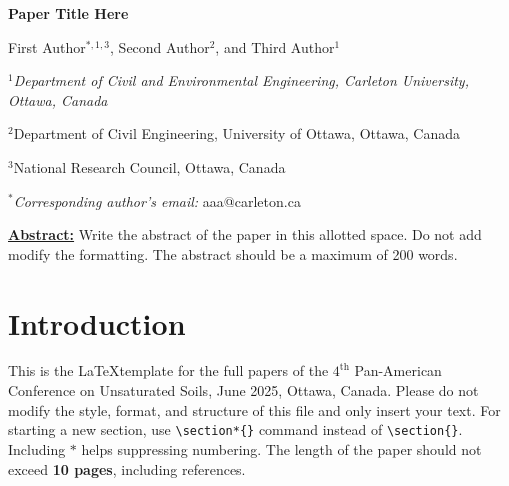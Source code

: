 \documentclass[letter,12pt]{article}
\begin{document}
\thispagestyle{fancy} %


\begin{center}
\vspace*{1.5cm}
{\large \bf Paper Title Here}
\bigskip

{First Author$^{*,1,3}$,
Second Author$^2$, 
and Third Author$^{1}$}

\smallskip

{\small\it
$^1$Department of Civil and Environmental Engineering, Carleton University, Ottawa, Canada

$^2$Department of Civil Engineering, University of Ottawa, Ottawa, Canada

$^3$National Research Council, Ottawa, Canada

}

$^*$\textit{Corresponding author's email: }aaa@carleton.ca

\end{center}


\bigskip

\noindent\underline{\textbf{Abstract:}} 
Write the abstract of the paper in this allotted space. Do not add modify the formatting. The abstract should be a maximum of 200 words. 



\bigskip
\section*{Introduction}

This is the \LaTeX template for the full papers of the $4^{\text{th}}$ Pan-American Conference on Unsaturated Soils, June 2025, Ottawa, Canada. Please do not modify the style, format, and structure of this file and only insert your text. For starting a new section, use \verb|\section*{}| command instead of \verb|\section{}|. Including $*$ helps suppressing  numbering. The length of the paper should not exceed \textbf{10 pages}, including references.
\end{document}

